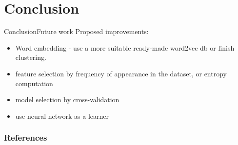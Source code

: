 \documentclass[xcolor=table]{beamer}
\begin{document}
 
 		
 
 		


	
	

 		






\section{Conclusion}
\begin{frame}{Conclusion}{Future work}
Proposed improvements:
\begin{itemize}
    \item Word embedding - use a more suitable ready-made word2vec db or finish clustering.
    \item feature selection by frequency of appearance in the dataset, or entropy computation
    \item model selection by cross-validation
    \item use neural network as a learner
\end{itemize}


\end{frame}


\begin{frame}[allowframebreaks]
        \frametitle{References}
        \nocite{*}
        
        
\end{frame}
\end{document}
